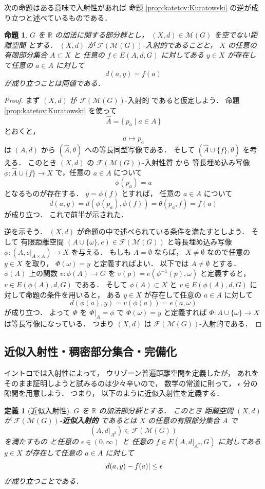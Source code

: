 \documentclass[leqno, 12pt]{jsarticle}
\newtheorem{prop}[thm]{命題}
\newtheorem{df}[thm]{定義}
\newcommand{\rr}{\mathbb{R}}
\DeclarePairedDelimiter{\abs}{\lvert}{\rvert}
\newcommand{\Met}[1]{\mathscr{M}(#1)}
\newcommand{\FinitePart}[1]{\mathscr{F}(#1)}
\newcommand{\FinMet}[1]{\FinitePart{\Met{#1}}}
\newcommand{\restr}[2]{#1|_{#2}}
\newcommand{\Espace}[3]{E(#1,#2,#3)}
\newcommand{\KatDist}{\theta}
\newcommand{\kura}[1]{p_{#1}}
\begin{document}
次の命題はある意味で入射性があれば
命題
\ref{prop:katetov:Kuratowski}
の逆が成り立つと述べているものである．
\begin{prop}\label{prop:katetov:injandpt}
$G$
を
$\rr$
の加法に関する部分群とし，
$(X, d)\in \Met{G}$
を空でない距離空間
とする．
$(X, d)$
が
$\FinMet{G}$-入射的であることと，
$X$
の任意の有限部分集合
$A\subset X$
と
任意の
$f\in \Espace{A}{d}{G}$
に対してある
$y\in X$
が存在して任意の
$a\in A$%
に対して
\[
d(a, y)=f(a)
\]
が成り立つことは同値である．
\end{prop}
\begin{proof}
まず
$(X, d)$
が
$\FinMet{G}$-入射的
であると仮定しよう．
命題
\ref{prop:katetov:Kuratowski}
を使って
\[
\widehat A=\{\,\kura{a}\mid a\in A\,\}
\]
とおくと，
\[
a\longmapsto\kura{a}
\]
は
$(A,d)$
から
$(\widehat A,\KatDist)$
への等長同型写像である．
そして
$(\widehat A\cup\{f\}, \KatDist)$
を考える．
このとき
$(X, d)$%
の
$\FinMet{G}$-入射性質
から
等長埋め込み写像
$\phi\colon\widehat A\cup\{f\}\to X$
で，任意の
$a\in A$
について
\[
\phi(\kura{a})=a
\]
となるものが存在する．
$y=\phi(f)$%
とすれば，
任意の%
$a\in A$%
について
\[
d(a, y)
=d(\phi(\kura{a}),\phi(f))
=\KatDist(\kura{a},f)
=f(a)
\]
が成り立つ．%
これで前半が示された．


逆を示そう．
$(X, d)$
が命題の中で述べられている条件を満たすとしよう．
そして
有限距離空間
$(A\cup \{\omega\}, e)\in\FinMet{G}$
と等長埋め込み写像
$\phi\colon
\left(A,\restr{e}{A\times A}\right)\to X$
を与える．
もしも
$A=\emptyset$
ならば，
$X\neq\emptyset$
なので任意の
$y\in X$
を取り，
$\Phi(\omega)=y$
と定義すればよい．
以下では
$A\neq\emptyset$
とする．
$\phi(A)$%
上の関数
$v\colon  \phi(A)\to G$
を
$v(p)=e(\phi^{-1}(p),\omega)$%
と定義すると，
$v\in \Espace{\phi(A)}{d}{G}$
である．
そして
$\phi(A)\subset X$
と
$v\in \Espace{\phi(A)}{d}{G}$%
に対して命題の条件を用いると，
ある
$y\in X$
が存在して任意の
$a\in A$
に対して
\[
d(\phi(a), y)=v(\phi(a))=e(a, \omega)
\]
が成り立つ．
よって
$\Phi$
を
$\restr{\Phi}{A}=\phi$
で
$\Phi(\omega)=y$
と定義すれば
$\Phi\colon A\cup\{\omega\}\to X$
は等長写像になっている．
つまり
$(X, d)$
は
$\FinMet{G}$-入射的である．
\end{proof}


\subsection{近似入射性・稠密部分集合・完備化}\label{subsec:katetov:approximate-injectivity}

イントロでは入射性によって，
ウリゾーン普遍距離空間を定義したが，
あれをそのまま証明しようと試みるのは少々辛いので，
数学の常道に則って，
$\epsilon$
分の隙間を用意しよう．
つまり，
以下のように近似入射性を定義する．
\begin{df}[近似入射性]\label{df:katetov:apprxinj}
$G$
を
$\rr$
の加法部分群とする．
このとき
距離空間
$(X, d)$
が
\textbf{%
$\FinMet{G}$-近似入射的}
であるとは
$X$
の任意の有限部分集合
$A$
で
\[
\left(A,\restr{d}{A^2}\right)\in\FinMet{G}
\]
を満たすもの
と任意の
$\epsilon\in (0, \infty)$
と
任意の
$f\in \Espace{A}{\restr{d}{A^2}}{G}$
に対してある
$y\in X$
が存在して任意の
$a\in A$
に対して
\[
\abs{d(a, y)-f(a)}\le \epsilon
\]
が成り立つことである．
\end{df}
\end{document}

